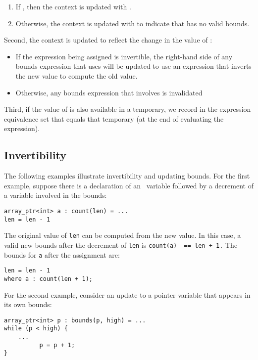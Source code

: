 \begin{enumerate}
\item
  If , then the context is updated with
  .
\item
  Otherwise, the context is updated with 
   to indicate that  has no valid bounds.
\end{enumerate}

Second, the context is updated to reflect the change in the value of
:

\begin{itemize}
\item
  If the expression being assigned is invertible, the right-hand side of
  any bounds expression that uses  will be updated to use an
  expression that inverts the new value to compute the old value.
\item
  Otherwise, any bounds expression that involves  is invalidated
\end{itemize}

Third, if the value of  is also available in a temporary,
we record in the expression equivalence set that  equals that
temporary (at the end of evaluating the expression).

\subsection{Invertibility}

The following examples illustrate invertibility and updating bounds. For
the first example, suppose there is a declaration of an
\arrayptr\ variable followed by a decrement of a variable
involved in the bounds:

\begin{lstlisting}
array_ptr<int> a : count(len) = ...
len = len - 1
\end{lstlisting}

The original value of \lstinline|len| can be computed from the new value.
In this case, a valid new bounds after the decrement of \lstinline|len| is
\lstinline|count(a)  == len + 1.| The bounds for \lstinline|a| after the
assignment are:
\begin{lstlisting}
len = len - 1
where a : count(len + 1);
\end{lstlisting}

For the second example, consider an update to a pointer variable that
appears in its own bounds:
\begin{lstlisting}
array_ptr<int> p : bounds(p, high) = ...         
while (p < high) {
    ...
          p = p + 1;
}
\end{lstlisting}

